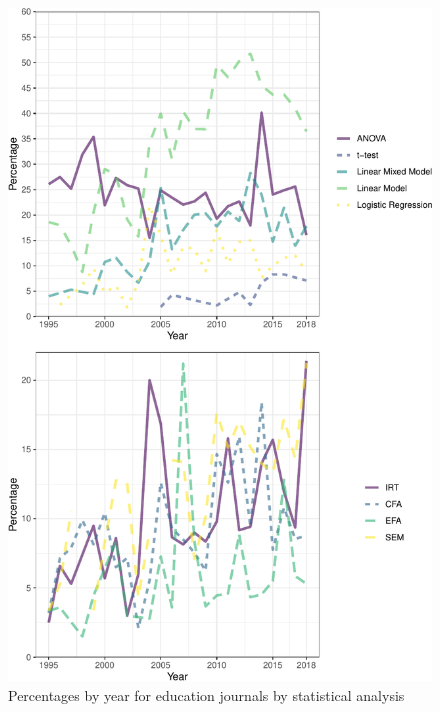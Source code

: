\documentclass[
  english,
  ,man]{apa6}
\begin{document}
\begin{figure}
\centering
\includegraphics{software_files/figure-latex/model-year-at1-1.pdf}
\caption{\label{fig:model-year-at1}Percentages by year for education journals by statistical analysis}
\end{figure}
\end{document}

